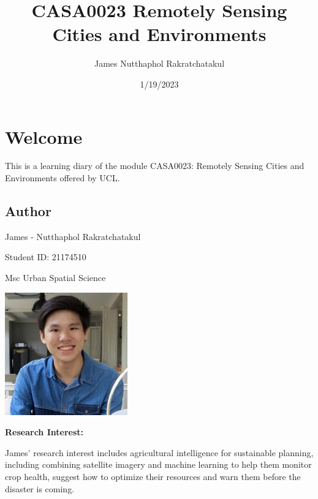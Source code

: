 \documentclass[
  letterpaper,
  DIV=11,
  numbers=noendperiod]{scrreprt}
\title{CASA0023 Remotely Sensing Cities and Environments}
\author{James Nutthaphol Rakratchatakul}
\date{1/19/2023}
\renewcommand*\contentsname{Table of contents}
\newcommand\contentsname{Table of contents}
\begin{document}
\maketitle
\ifdefined\Shaded\renewenvironment{Shaded}{\begin{tcolorbox}[interior hidden, boxrule=0pt, borderline west={3pt}{0pt}{shadecolor}, breakable, frame hidden, sharp corners, enhanced]}{\end{tcolorbox}}\fi

\renewcommand*\contentsname{Table of contents}
{
\hypersetup{linkcolor=}
\setcounter{tocdepth}{2}
\tableofcontents
}

\hypertarget{welcome}{%
\chapter*{Welcome}\label{welcome}}

This is a learning diary of the module CASA0023: Remotely Sensing Cities
and Environments offered by UCL.

\hypertarget{author}{%
\section*{\texorpdfstring{\textbf{Author}}{Author}}\label{author}}

James - Nutthaphol Rakratchatakul

Student ID: 21174510

Msc Urban Spatial Science

\includegraphics{./images/james_pic.jpg}

\textbf{Research Interest:}

James' research interest includes agricultural intelligence for
sustainable planning, including combining satellite imagery and machine
learning to help them monitor crop health, suggest how to optimize their
resources and warn them before the disaster is coming.
\end{document}
